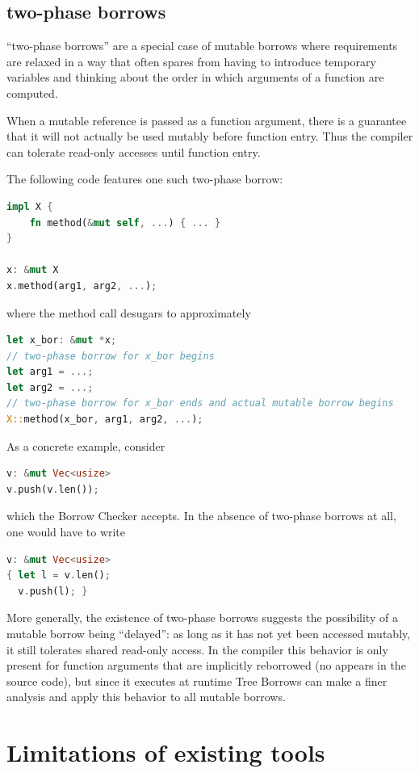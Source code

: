 \documentclass[a4paper,11pt]{article}
\theoremstyle{plain}
\theoremstyle{definition}
\theoremstyle{remark}
\newcommand{\tcode}[1]{\rstinline{#1}}
\begin{document}
\subsection{two-phase borrows}

``two-phase borrows'' are a special case of mutable borrows where requirements
are relaxed in a way that often spares from having to introduce temporary variables
and thinking about the order in which arguments of a function are computed.

When a mutable reference is passed as a function argument, there is a guarantee
that it will not actually be used mutably before function entry. Thus the compiler
can tolerate read-only accesses until function entry.

The following code features one such two-phase borrow:
\begin{lstlisting}[language=rust]
impl X {
    fn method(&mut self, ...) { ... }
}

x: &mut X
x.method(arg1, arg2, ...);
\end{lstlisting}
where the method call desugars to approximately
\begin{lstlisting}[language=rust]
let x_bor: &mut *x;
// two-phase borrow for x_bor begins
let arg1 = ...;
let arg2 = ...;
// two-phase borrow for x_bor ends and actual mutable borrow begins
X::method(x_bor, arg1, arg2, ...);
\end{lstlisting}

As a concrete example, consider
\begin{lstlisting}[language=rust]
v: &mut Vec<usize>
v.push(v.len());
\end{lstlisting}
which the Borrow Checker accepts.
In the absence of two-phase borrows at all, one would have to write
\begin{lstlisting}[language=rust]
v: &mut Vec<usize>
{ let l = v.len();
  v.push(l); }
\end{lstlisting}

More generally, the existence of two-phase borrows suggests the possibility of a mutable
borrow being ``delayed'': as long as it has not yet been accessed mutably, it still
tolerates shared read-only access.
In the compiler this behavior is only present for function arguments that are
implicitly reborrowed (no \tcode{\&mut} appears in the source code), but since it
executes at runtime Tree Borrows can make a finer analysis and apply this behavior
to all mutable borrows.


\section{Limitations of existing tools}
\end{document}

